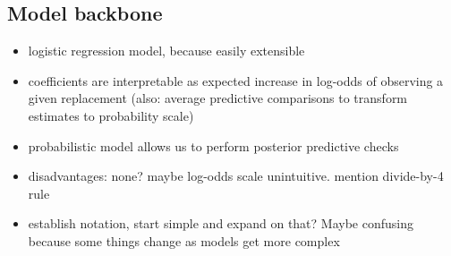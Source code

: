 \documentclass[fleqn,11pt]{SelfArx} %
\begin{document}
\subsection*{Model backbone}
\begin{itemize}
  \item logistic regression model, because easily extensible
  \item coefficients are interpretable as expected increase in log-odds of observing 
    a given replacement (also: average predictive comparisons to transform estimates to
    probability scale)
  \item probabilistic model allows us to perform posterior predictive checks
  \item disadvantages: none? maybe log-odds scale unintuitive. mention divide-by-4 rule
  \item  establish notation, start simple and expand on that? Maybe confusing because
    some things change as models get more complex 
\end{itemize}
\end{document}
